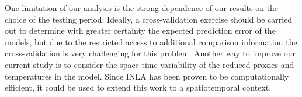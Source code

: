 \documentclass[12pt]{amsart}
\theoremstyle{plain}
\theoremstyle{definition}
\theoremstyle{remark}
\begin{document}
One limitation of our analysis is the strong
dependence of our results on the choice of the testing period. Ideally, a
cross-validation exercise should be carried out to determine with greater
certainty the expected prediction error of the models, but due to the restricted access to
additional comparison information the cross-validation is very challenging for this problem. 
Another way to improve our current study is to consider the space-time variability of the reduced proxies and temperatures in the model. 
Since INLA has been proven to be computationally
efficient, it could be used to extend this work to a spatiotemporal context.






\end{document}
